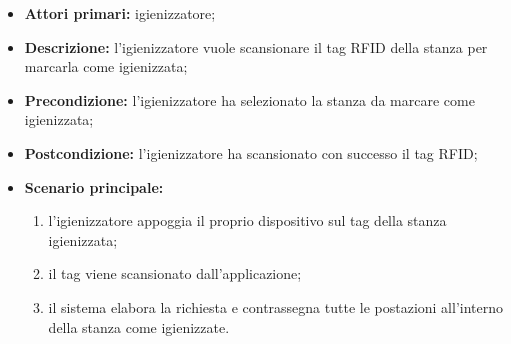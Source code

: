     \begin{itemize}
        \item \textbf{Attori primari:} igienizzatore;
        \item \textbf{Descrizione:} l’igienizzatore vuole scansionare il tag RFID della stanza per marcarla come igienizzata;
        \item \textbf{Precondizione:} l'igienizzatore ha selezionato la stanza da marcare come igienizzata; 
        \item \textbf{Postcondizione:} l'igienizzatore ha scansionato con successo il tag RFID;
        \item \textbf{Scenario principale:} 
            \begin{enumerate}	
                \item l'igienizzatore appoggia il proprio dispositivo sul tag della stanza igienizzata;
                \item il tag viene scansionato dall'applicazione;
                \item il sistema elabora la richiesta e contrassegna tutte le postazioni all'interno della stanza come igienizzate.
            \end{enumerate}
    \end{itemize}
